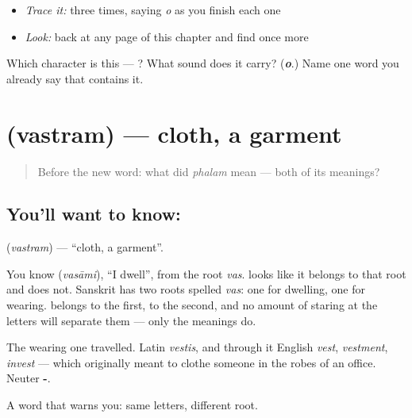 \begin{quote}
\end{quote}

\begin{itemize}
\raggedright
  \item \emph{Trace it:}  three times, saying \emph{o} as you finish each one
  \item \emph{Look:} back at any page of this chapter and find  once more
\end{itemize}

\begin{tcolorbox}[breakable,colback=teal!4,colframe=teal!35!black,title={Before you move on}]
Which character is this — ? What sound does it carry? (\emph{\textbf{o}}.) Name one word you already say that contains it.
\end{tcolorbox}
\section[\texorpdfstring{\sk{वस्त्रम्} (vastram)}{वस्त्रम् (vastram)}]{ (vastram) — cloth, a garment}

\label{lesson:SA-C24-cloth}



\begin{quote}
Before the new word: what did \emph{phalam} mean — both of its meanings?
\end{quote}

\subsection*{You'll want to know: }
\textbf{} (\emph{vastram}) — \textquotedblleft{}cloth, a garment\textquotedblright{}.

You know \textbf{} (\emph{vasāmi}), \textquotedblleft{}I dwell\textquotedblright{}, from the root \emph{vas}. \textbf{} looks like it belongs to that root and does not. Sanskrit has two roots spelled \emph{vas}: one for dwelling, one for wearing.  belongs to the first,  to the second, and no amount of staring at the letters will separate them — only the meanings do.

The wearing one travelled. Latin \emph{vestis}, and through it English \emph{vest}, \emph{vestment}, \emph{invest} — which originally meant to clothe someone in the robes of an office. Neuter \textbf{-}.

\begin{grammarlens}[title={What you've built}]
A word that warns you: same letters, different root.
\end{grammarlens}

